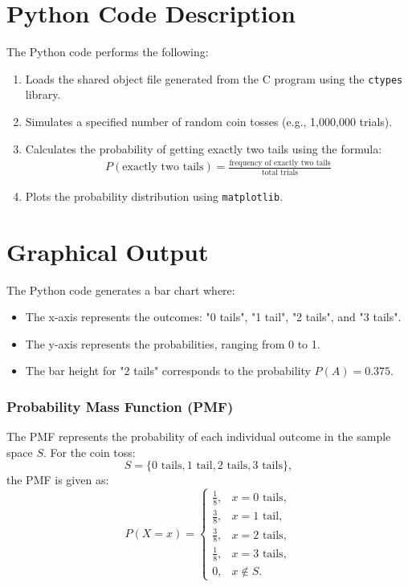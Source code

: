 \documentclass[journal]{IEEEtran}
\begin{document}
\section*{Python Code Description}
The Python code performs the following:
\begin{enumerate}
    \item Loads the shared object file generated from the C program using the \texttt{ctypes} library.
    \item Simulates a specified number of random coin tosses (e.g., 1,000,000 trials).
    \item Calculates the probability of getting exactly two tails using the formula:
    \begin{align}
    P(\text{exactly two tails}) = \frac{\text{frequency of exactly two tails}}{\text{total trials}}
    \end{align}
    \item Plots the probability distribution using \texttt{matplotlib}.
\end{enumerate}

\section*{Graphical Output}
The Python code generates a bar chart where:
\begin{itemize}
    \item The x-axis represents the outcomes: "0 tails", "1 tail", "2 tails", and "3 tails".
    \item The y-axis represents the probabilities, ranging from 0 to 1.
    \item The bar height for "2 tails" corresponds to the probability $P(A) = 0.375$.
\end{itemize}

\subsubsection*{Probability Mass Function (PMF)}
The PMF represents the probability of each individual outcome in the sample space \( S \). For the coin toss:
\[
S = \{0 \text{ tails}, 1 \text{ tail}, 2 \text{ tails}, 3 \text{ tails}\},
\]
the PMF is given as:
\[
P(X = x) = 
\begin{cases} 
\frac{1}{8}, & x = 0 \text{ tails}, \\
\frac{3}{8}, & x = 1 \text{ tail}, \\
\frac{3}{8}, & x = 2 \text{ tails}, \\
\frac{1}{8}, & x = 3 \text{ tails}, \\
0, & x \notin S.
\end{cases}
\]
\end{document}
